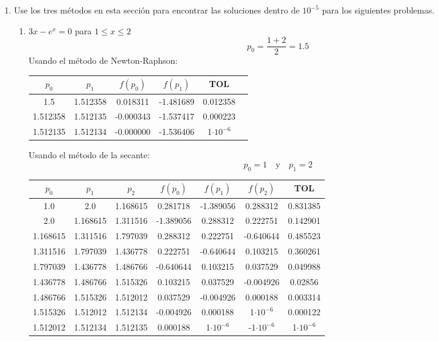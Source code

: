 \documentclass[12pt]{article}
\begin{document}
\begin{enumerate}
    \item Use los tres métodos en esta sección para encontrar las soluciones dentro de \(10^{-5}\) para los siguientes problemas.
    \begin{enumerate}
        \item \( 3x - e^x = 0 \) para \( 1 \leq x \leq 2 \)
        \[p_0 = \frac{1+2}{2} = 1.5\]
        Usando el método de Newton-Raphson:
        \begin{center}
        \begin{tabular}{|c|c|c|c|c|c|}
        \hline
        \(p_0\) & \(p_1\) & \(f(p_0)\) & \(f(p_1)\) & \textbf{TOL} \\
        \hline
        1.5 & 1.512358 & 0.018311 & -1.481689 &  0.012358 \\
        1.512358 & 1.512135 & -0.000343 & -1.537417 &  0.000223 \\
        1.512135 & 1.512134 & -0.000000 & -1.536406 &  1\(\cdot 10^{-6}\) \\
        \hline 
        \end{tabular}
        \end{center}

        Usando el método de la secante:
        \[p_0 = 1 \quad \text{y} \quad p_1 = 2\]
        
        
        \begin{center}
        \begin{tabular}{|c|c|c|c|c|c|c|}
        \hline
        \(p_0\) & \(p_1\) & \(p_2\)& \(f(p_0)\) & \(f(p_1)\)&\(f(p_2)\) & \textbf{TOL} \\
        \hline
        1.0 & 2.0 & 1.168615 & 0.281718 & -1.389056 & 0.288312 & 0.831385 \\
        2.0 & 1.168615 & 1.311516 & -1.389056 & 0.288312 & 0.222751 & 0.142901 \\
        1.168615 & 1.311516 & 1.797039 & 0.288312 & 0.222751 & -0.640644 & 0.485523 \\
        1.311516 & 1.797039 & 1.436778 & 0.222751 & -0.640644 & 0.103215 & 0.360261 \\
        1.797039 & 1.436778 & 1.486766 & -0.640644 & 0.103215 & 0.037529 & 0.049988 \\
        1.436778 & 1.486766 & 1.515326 & 0.103215 & 0.037529 & -0.004926 & 0.02856 \\
        1.486766 & 1.515326 & 1.512012 & 0.037529 & -0.004926 & 0.000188 & 0.003314 \\
        1.515326 & 1.512012 & 1.512134 & -0.004926 & 0.000188 & 1\(\cdot 10^{-6}\) & 0.000122 \\
        1.512012 & 1.512134 & 1.512135 & 0.000188 & 1\(\cdot 10^{-6}\) & -1\(\cdot 10^{-6}\) & 1\(\cdot 10^{-6}\) \\ 
        \hline 
        \end{tabular}
        \end{center}


\end{enumerate}
\end{enumerate}
\end{document}
